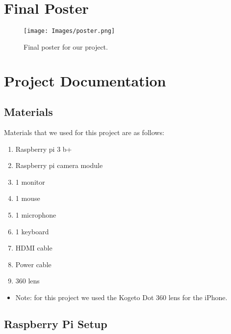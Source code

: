 \documentclass[onecolumn, draftclsnofoot,10pt, compsoc]{IEEEtran}
\begin{document}
            
            
\newpage

\section{Final Poster}
\begin{figure}[h]
    \centering
    \texttt{[image: Images/poster.png]} 
    \caption{Final poster for our project.}
\label{fig1}
\end{figure}

\newpage

\section{Project Documentation}
\subsection{Materials}
Materials that we used for this project are as follows:
\begin{enumerate}
    \item Raspberry pi 3 b+
    \item Raspberry pi camera module
    \item 1 monitor
    \item 1 mouse
    \item 1 microphone
    \item 1 keyboard
    \item HDMI cable
    \item Power cable
    \item 360 lens
\end{enumerate}
\begin{itemize}
    \item Note: for this project we used the Kogeto Dot 360 lens for the iPhone.
\end{itemize}
\newpage
\subsection{Raspberry Pi Setup}
\end{document}

